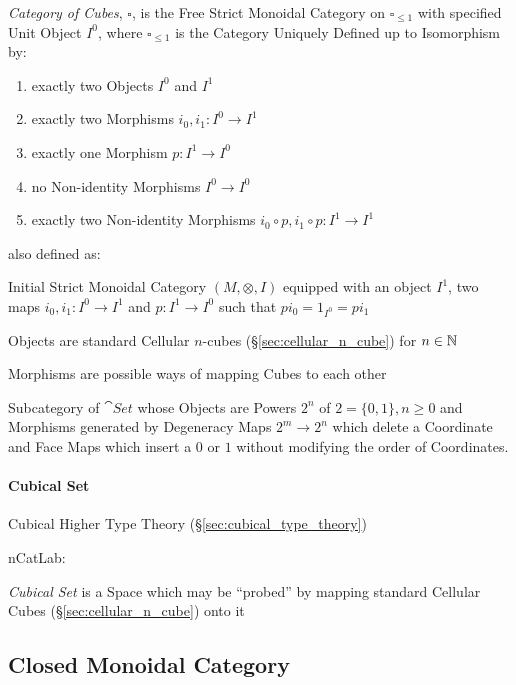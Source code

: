 \emph{Category of Cubes}, $\square$, is the Free Strict Monoidal
Category on $\square_{\leq 1}$ with specified Unit Object $I^0$, where
$\square_{\leq 1}$ is the Category Uniquely Defined up to Isomorphism
by:
\begin{enumerate}
  \item exactly two Objects $I^0$ and $I^1$
  \item exactly two Morphisms $i_0, i_1 : I^0 \rightarrow I^1$
  \item exactly one Morphism $p : I^1 \rightarrow I^0$
  \item no Non-identity Morphisms $I^0 \rightarrow I^0$
  \item exactly two Non-identity Morphisms
    $i_0 \circ p, i_1 \circ p : I^1 \rightarrow I^1$
\end{enumerate}

also defined as:

Initial Strict Monoidal Category $(M, \otimes, I)$ equipped with an
object $I^1$, two maps $i_0, i_1 : I^0 \rightarrow I^1$ and $p : I^1
\rightarrow I^0$ such that $pi_0 = 1_{I^0} = pi_1$

Objects are standard Cellular $n$-cubes (\S\ref{sec:cellular_n_cube})
for $n \in \mathbb{N}$

Morphisms are possible ways of mapping Cubes to each other

Subcategory of $\cat{Set}$ whose Objects are Powers $2^n$ of $2 =
\{0,1\}, n \geq 0$ and Morphisms generated by Degeneracy Maps $2^m
\rightarrow 2^n$ which delete a Coordinate and Face Maps which insert
a $0$ or $1$ without modifying the order of Coordinates. %



\paragraph{Cubical Set}\label{sec:cubical_set}\hfill

Cubical Higher Type Theory (\S\ref{sec:cubical_type_theory})

nCatLab:

\emph{Cubical Set} is a Space which may be ``probed'' by mapping
standard Cellular Cubes (\S\ref{sec:cellular_n_cube}) onto it



\subsection{Closed Monoidal Category}\label{sec:closed_monoidal}

